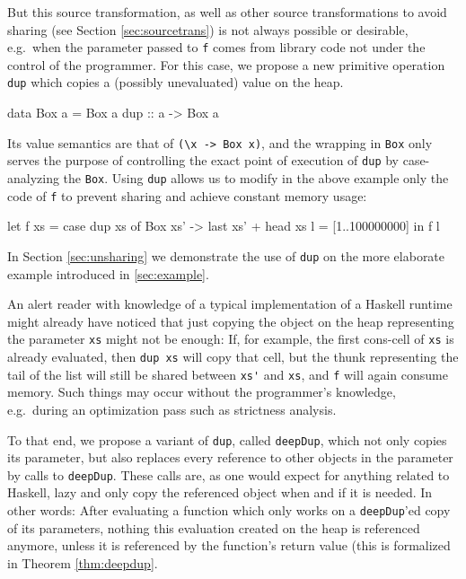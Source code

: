 \documentclass[preprint]{sigplanconf}
\theoremstyle{nonumberplain}
\newcommand{\li}{\lstinline[style=Haskell]}
\begin{document}
But this source transformation, as well as other source transformations to avoid sharing (see Section \ref{sec:sourcetrans}) is not always possible or desirable, e.g.\  when the parameter passed to \li-f- comes from library code not under the control of the programmer. For this case, we propose a new primitive operation \lstinline-dup- which copies a (possibly unevaluated) value on the heap.
\begin{haskell}
data Box a = Box a
dup :: a -> Box a
\end{haskell}
Its value semantics are that of \li!(\x -> Box x)!, and the wrapping in \lstinline-Box- only serves the purpose of controlling the exact point of execution of \lstinline-dup- by case-analyzing the \lstinline-Box-. Using \lstinline-dup- allows us to modify in the above example only the code of \lstinline-f- to prevent sharing and achieve constant memory usage:
\begin{haskell}
let f xs = case dup xs of
    	Box xs' -> last xs' + head xs
    l = [1..100000000]
in  f l
\end{haskell}
In Section \ref{sec:unsharing} we demonstrate the use of \li-dup- on the more elaborate example introduced in \ref{sec:example}.

An alert reader with knowledge of a typical implementation of a Haskell runtime might already have noticed that just copying the object on the heap representing the parameter \li-xs- might not be enough: If, for example, the first cons-cell of \li-xs- is already evaluated, then \li-dup xs- will copy that cell, but the thunk representing the tail of the list will still be shared between \li-xs'- and \li-xs-, and \li-f- will again consume memory. Such things may occur without the programmer’s knowledge, e.g.\ during an optimization pass such as strictness analysis.

To that end, we propose a variant of \li-dup-, called \li-deepDup-, which not only copies its parameter, but also replaces every reference to other objects in the parameter by calls to \li-deepDup-. These calls are, as one would expect for anything related to Haskell, lazy and only copy the referenced object when and if it is needed. In other words: After evaluating a function which only works on a \li-deepDup-’ed copy of its parameters, nothing this evaluation created on the heap is referenced anymore, unless it is referenced by the function's return value (this is formalized in Theorem \ref{thm:deepdup}.
\end{document}
